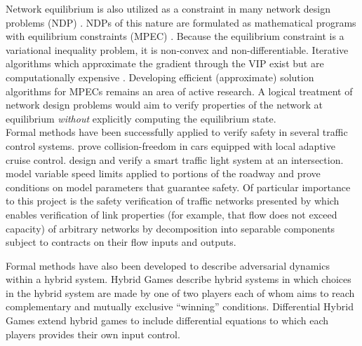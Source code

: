 Network equilibrium is also utilized as a constraint in many network design problems (NDP) \citep{sheffi1983optimal}.
NDPs of this nature are formulated as mathematical programs with equilibrium  constraints (MPEC) \citep{luo1996mathematical}.
Because the equilibrium constraint is a variational inequality problem, it is non-convex and non-differentiable.
Iterative algorithms which approximate the gradient through the VIP exist but are computationally expensive \citep{josefsson2007sensitivity}.
Developing efficient (approximate) solution algorithms for MPECs remains an area of active research.
A logical treatment of network design problems would aim to verify properties of the network at equilibrium \textit{without} explicitly computing the equilibrium state.\\

Formal methods have been successfully applied to verify safety in several traffic control systems.
\citet{DBLP:conf/fm/LoosPN11} prove collision-freedom in cars equipped with local adaptive cruise control.
\citet{DBLP:conf/itsc/LoosP11} design and verify a smart traffic light system at an intersection.
\citet{DBLP:conf/iccps/MitschLP12} model variable speed limits applied to portions of the roadway and prove conditions on model parameters that guarantee safety.
Of particular importance to this project is the safety verification of traffic networks presented by \citet{DBLP:conf/itsc/MullerMP15} which enables verification of link properties (for example, that flow does not exceed capacity) of arbitrary networks by decomposition into separable components subject to contracts on their flow inputs and outputs. 

Formal methods have also been developed to describe adversarial dynamics within a hybrid system.
Hybrid Games \citep{Platzer13:dGL} describe hybrid systems in which choices in the hybrid system are made by one of two players each of whom aims to reach complementary and mutually exclusive ``winning'' conditions.
Differential Hybrid Games \citep{DBLP:journals/tocl/Platzer17} extend hybrid games to include differential equations to which each players provides their own input control.